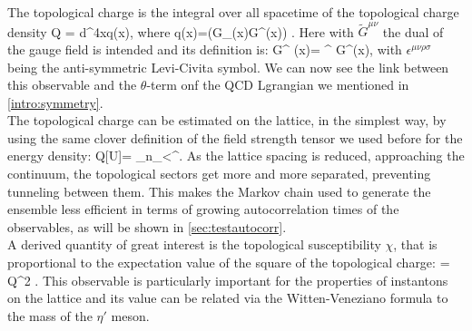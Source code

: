 The topological charge is the integral over all spacetime of the topological charge density
\beq
    Q = \int d^4xq(x),
\eeq
where
\beq 
    q(x)=\Tr(G_{\mu\nu}(x)\tilde G^{\mu\nu}(x)) .
\eeq 
Here with $\tilde G^{\mu\nu}$ the dual of the gauge field is intended and its definition is:
\beq
\tilde G^{\mu\nu} (x)= \epsilon^{\mu\nu\rho\sigma} G^{\rho\sigma}(x),
\eeq
with $\epsilon^{\mu\nu\rho\sigma}$ being the anti-symmetric Levi-Civita symbol. We can now see the link between this observable and the $\theta$-term onf the QCD Lgrangian we mentioned in \cref{intro:symmetry}.\\
The topological charge can be estimated on the lattice, in the simplest way, by using the same clover definition of the field strength tensor we used before for the energy density:
\beq
    Q[U]= \sum_{n\in\Lambda}\sum_{\mu<\nu}\epsilon^{\mu\nu\rho\sigma}.
    \label{eq:topc}
\eeq
As the lattice spacing is reduced, approaching the continuum, the topological sectors get more and more separated, preventing tunneling between them. This makes the Markov chain used to generate the ensemble less efficient in terms of growing autocorrelation times of the observables, as will be shown in \cref{sec:testautocorr}.\\
A derived quantity of great interest is the topological susceptibility $\chi$, that is proportional to the expectation value of the square of the topological charge:
\beq
    \chi = \langle Q^2 \rangle.
    \label{eq:topsus}
\eeq
This observable is particularly important for the properties of instantons on the lattice and its value can be related via the Witten-Veneziano formula \cite{witten_current_1979} to the mass of the $\eta'$ meson.

